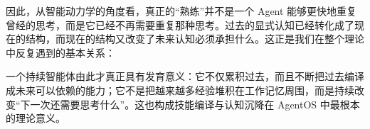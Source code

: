 因此，从智能动力学的角度看，真正的“熟练”并不是一个 Agent 能够更快地重复曾经的思考，而是它已经不再需要重复那种思考。过去的显式认知已经转化成了现在的结构，而现在的结构又改变了未来认知必须承担什么。这正是我们在整个理论中反复遇到的基本关系：

\begin{statementbox}
\centering
{}
\end{statementbox}

一个持续智能体由此才真正具有发育意义：它不仅累积过去，而且不断把过去编译成未来可以依赖的能力；它不是把越来越多经验堆积在工作记忆周围，而是持续改变“下一次还需要思考什么”。这也构成技能编译与认知沉降在 AgentOS 中最根本的理论意义。
